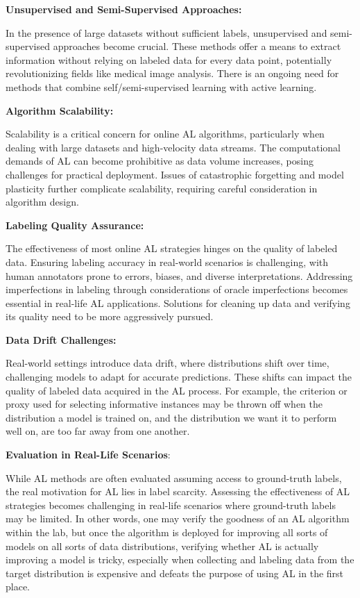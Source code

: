 \documentclass[
  letterpaper,
  DIV=11,
  numbers=noendperiod,
  oneside]{scrreprt}
\theoremstyle{remark}
\begin{document}
\textbf{Unsupervised and Semi-Supervised Approaches:}

In the presence of large datasets without sufficient labels,
unsupervised and semi-supervised approaches become crucial. These
methods offer a means to extract information without relying on labeled
data for every data point, potentially revolutionizing fields like
medical image analysis. There is an ongoing need for methods that
combine self/semi-supervised learning with active learning.

\textbf{Algorithm Scalability:}

Scalability is a critical concern for online AL algorithms, particularly
when dealing with large datasets and high-velocity data streams. The
computational demands of AL can become prohibitive as data volume
increases, posing challenges for practical deployment. Issues of
catastrophic forgetting and model plasticity further complicate
scalability, requiring careful consideration in algorithm design.

\textbf{Labeling Quality Assurance:}

The effectiveness of most online AL strategies hinges on the quality of
labeled data. Ensuring labeling accuracy in real-world scenarios is
challenging, with human annotators prone to errors, biases, and diverse
interpretations. Addressing imperfections in labeling through
considerations of oracle imperfections becomes essential in real-life AL
applications. Solutions for cleaning up data and verifying its quality
need to be more aggressively pursued.

\textbf{Data Drift Challenges:}

Real-world settings introduce data drift, where distributions shift over
time, challenging models to adapt for accurate predictions. These shifts
can impact the quality of labeled data acquired in the AL process. For
example, the criterion or proxy used for selecting informative instances
may be thrown off when the distribution a model is trained on, and the
distribution we want it to perform well on, are too far away from one
another.

\textbf{Evaluation in Real-Life Scenarios}:

While AL methods are often evaluated assuming access to ground-truth
labels, the real motivation for AL lies in label scarcity. Assessing the
effectiveness of AL strategies becomes challenging in real-life
scenarios where ground-truth labels may be limited. In other words, one
may verify the goodness of an AL algorithm within the lab, but once the
algorithm is deployed for improving all sorts of models on all sorts of
data distributions, verifying whether AL is actually improving a model
is tricky, especially when collecting and labeling data from the target
distribution is expensive and defeats the purpose of using AL in the
first place.
\end{document}

